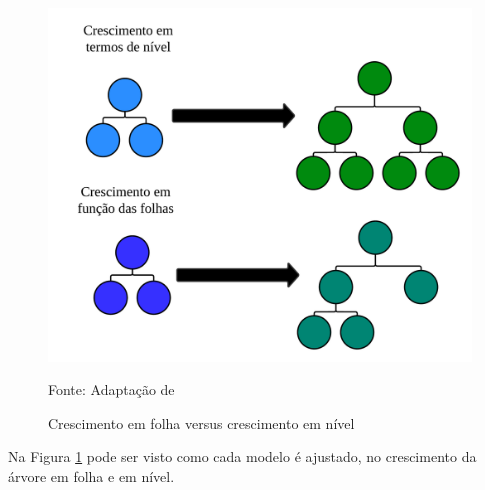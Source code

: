 \begin{figure}[H]
	\centering
	\caption{Crescimento em folha versus crescimento em nível}
	\label{fig:xgboost}
	\includegraphics[width=1\linewidth]{Modelos/Figuras/xgboost}
	
	Fonte: Adaptação de 
\end{figure}


Na Figura \ref{fig:xgboost} pode ser visto como cada modelo é ajustado, no crescimento da árvore em folha e em nível.



